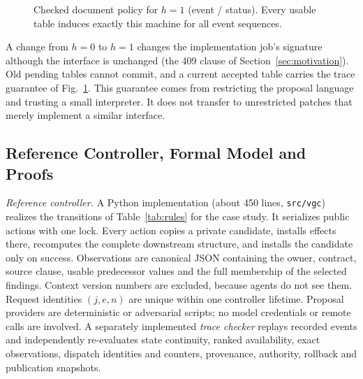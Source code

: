 \documentclass[10pt,journal,compsoc]{IEEEtran}
\theoremstyle{plain}
\theoremstyle{definition}
\begin{document}
\begin{figure}[!t]
\centering
{}%
\caption{Checked document policy for $h=1$ (event / status). Every usable table induces exactly this machine for all event sequences.}\label{fig:policy}
\end{figure}

A change from $h=0$ to $h=1$ changes the implementation job's signature although the interface is unchanged (the 409 clause of Section~\ref{sec:motivation}). Old pending tables cannot commit, and a current accepted table carries the trace guarantee of Fig.~\ref{fig:policy}. This guarantee comes from restricting the proposal language and trusting a small interpreter. It does not transfer to unrestricted patches that merely implement a similar interface.

\subsection{Reference Controller, Formal Model and Proofs}\label{sec:artifact}
\emph{Reference controller.} A Python implementation (about 450 lines, \texttt{src/vgc}) realizes the transitions of Table~\ref{tab:rules} for the case study. It serializes public actions with one lock. Every action copies a private candidate, installs effects there, recomputes the complete downstream structure, and installs the candidate only on success. Observations are canonical JSON containing the owner, contract, source clause, usable predecessor values and the full membership of the selected findings. Context version numbers are excluded, because agents do not see them. Request identities $(j,e,n)$ are unique within one controller lifetime. Proposal providers are deterministic or adversarial scripts; no model credentials or remote calls are involved. A separately implemented \emph{trace checker} replays recorded events and independently re-evaluates state continuity, ranked availability, exact observations, dispatch identities and counters, provenance, authority, rollback and publication snapshots.
\end{document}
